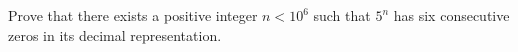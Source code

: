 Prove that there exists a positive integer $n < 10^6$ such that $5^n$ has six consecutive zeros in its decimal representation.